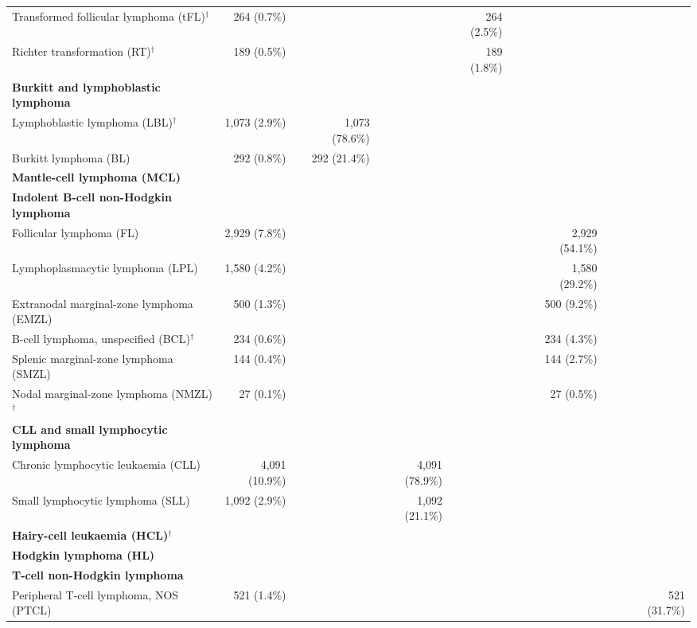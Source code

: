 \begin{table}
{\begin{tabular}{@{}lrrrrrrrrrrr@{}}
\qquad Transformed follicular lymphoma (tFL)$^{\dagger}$ & 264 (0.7\%) &  &  &  & 264 (2.5\%) &  &  &  &  &  &  \\
\qquad Richter transformation (RT)$^{\dagger}$ & 189 (0.5\%) &  &  &  & 189 (1.8\%) &  &  &  &  &  &  \\
\quad \textbf{Burkitt and lymphoblastic lymphoma} &  &  &  &  &  &  &  &  &  &  &  \\
\qquad Lymphoblastic lymphoma (LBL)$^{\dagger}$ & 1,073 (2.9\%) &  & 1,073 (78.6\%) &  &  &  &  &  &  &  &  \\
\qquad Burkitt lymphoma (BL) & 292 (0.8\%) &  & 292 (21.4\%) &  &  &  &  &  &  &  &  \\
\quad \textbf{Mantle-cell lymphoma (MCL)} &  &  &  &  &  &  &  &  &  &  &  \\
\quad \textbf{Indolent B-cell non-Hodgkin lymphoma} &  &  &  &  &  &  &  &  &  &  &  \\
\qquad Follicular lymphoma (FL) & 2,929 (7.8\%) &  &  &  &  &  &  & 2,929 (54.1\%) &  &  &  \\
\qquad Lymphoplasmacytic lymphoma (LPL) & 1,580 (4.2\%) &  &  &  &  &  &  & 1,580 (29.2\%) &  &  &  \\
\qquad Extranodal marginal-zone lymphoma (EMZL) & 500 (1.3\%) &  &  &  &  &  &  & 500 (9.2\%) &  &  &  \\
\qquad B-cell lymphoma, unspecified (BCL)$^{\dagger}$ & 234 (0.6\%) &  &  &  &  &  &  & 234 (4.3\%) &  &  &  \\
\qquad Splenic marginal-zone lymphoma (SMZL) & 144 (0.4\%) &  &  &  &  &  &  & 144 (2.7\%) &  &  &  \\
\qquad Nodal marginal-zone lymphoma (NMZL)$^{\dagger}$ & 27 (0.1\%) &  &  &  &  &  &  & 27 (0.5\%) &  &  &  \\
\quad \textbf{CLL and small lymphocytic lymphoma} &  &  &  &  &  &  &  &  &  &  &  \\
\qquad Chronic lymphocytic leukaemia (CLL) & 4,091 (10.9\%) &  &  & 4,091 (78.9\%) &  &  &  &  &  &  &  \\
\qquad Small lymphocytic lymphoma (SLL) & 1,092 (2.9\%) &  &  & 1,092 (21.1\%) &  &  &  &  &  &  &  \\
\quad \textbf{Hairy-cell leukaemia (HCL)$^{\dagger}$} &  &  &  &  &  &  &  &  &  &  &  \\
\quad \textbf{Hodgkin lymphoma (HL)} &  &  &  &  &  &  &  &  &  &  &  \\
\quad \textbf{T-cell non-Hodgkin lymphoma} &  &  &  &  &  &  &  &  &  &  &  \\
\qquad Peripheral T-cell lymphoma, NOS (PTCL) & 521 (1.4\%) &  &  &  &  &  &  &  &  &  & 521 (31.7\%) \\

\end{tabular}}
\end{table}
